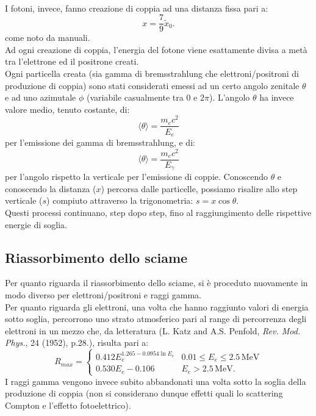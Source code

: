 \documentclass[10pt,a4paper,usenatbib]{article}
\newcommand*{\unit}[1]{\ensuremath{\mathrm{\,#1}}}                              %
\begin{document}
\\I fotoni, invece, fanno creazione di coppia ad una distanza fissa pari a: 
\begin{equation}
x = \frac{7}{9}\tilde{x}_0. 
\end{equation}
come noto da manuali. 
\\Ad ogni creazione di coppia, l'energia del fotone viene esattamente divisa a metà tra l'elettrone ed il positrone creati. 
\\Ogni particella creata (sia gamma di bremsstrahlung che elettroni/positroni di produzione di coppia) sono stati considerati emessi ad un certo angolo zenitale $\theta$ e ad uno azimutale $\phi$ (variabile casualmente tra 0 e $2\pi$). L'angolo $\theta$ ha invece valore medio, tenuto costante, di: 
\begin{equation}
\langle\theta\rangle = \frac{m_e c^2}{E_e}
\end{equation}
per l'emissione dei gamma di bremsstrahlung, e di: 
\begin{equation}
\langle\theta\rangle = \frac{m_e c^2}{E_\gamma}
\end{equation}
per l'angolo rispetto la verticale per l'emissione di coppie. Conoscendo $\theta$ e conoscendo la distanza ($x$) percorsa dalle particelle, possiamo risalire allo step verticale ($s$) compiuto attraverso la trigonometria: $s = x\cos{\theta}$. 
\\Questi processi continuano, step dopo step, fino al raggiungimento delle rispettive energie di soglia. 

\subsection{Riassorbimento dello sciame}
Per quanto riguarda il riassorbimento dello sciame, si è proceduto nuovamente in modo diverso per elettroni/positroni e raggi gamma. 
\\Per quanto riguarda gli elettroni, una volta che hanno raggiunto valori di energia sotto soglia, percorrono uno strato atmosferico pari al range di percorrenza degli elettroni in un mezzo che, da letteratura (L. Katz and A.S. Penfold, \textit{Rev. Mod. Phys.}, 24 (1952), p.28.), risulta pari a: 
\begin{equation}
R_{max} = \begin{cases} 0.412 E_e^{1.265-0.0954 \ln{E_e}}     & 0.01\le E_e \le 2.5\unit{MeV} \\ 
                                          0.530 E_e - 0.106                                   & E_e > 2.5\unit{MeV}. 
                   \end{cases}
\end{equation}
I raggi gamma vengono invece subito abbandonati una volta sotto la soglia della produzione di coppia (non si considerano dunque effetti quali lo scattering Compton e l'effetto fotoelettrico). 
\end{document}
